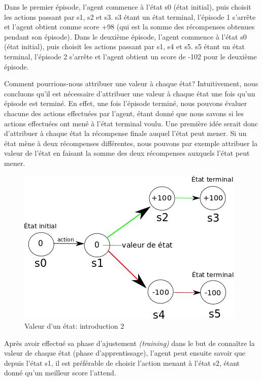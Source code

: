 \documentclass[11pt,a4paper]{report}
\begin{document}
    \newpage
    \par Dans le premier épisode, l'agent commence à l'état s0 (état initial), puis choisit les actions passant par s1, s2 et s3. s3 étant un état terminal, l'épisode 1 s'arrête et l'agent obtient comme score +98 (qui est la somme des récompenses obtenues pendant son épisode). Dans le deuxième épisode, l'agent commence à l'état s0 (état initial), puis choisit les actions passant par s1, s4 et s5. s5 étant un état terminal, l'épisode 2 s'arrête et l'agent obtient un score de -102 pour le deuxième épisode. 
    
    \par Comment pourrions-nous attribuer une valeur à chaque état? Intuitivement, nous concluons qu'il est nécessaire d'attribuer une valeur à chaque état une fois qu'un épisode est terminé. En effet, une fois l'épisode terminé, nous pouvons évaluer chacune des actions effectuées par l'agent, étant donné que nous savons si les actions effectuées ont mené à l'état terminal voulu. Une première idée serait donc d'attribuer à chaque état la récompense finale auquel l'état peut mener. Si un état mène à deux récompenses différentes, nous pouvons par exemple attribuer la valeur de l'état en faisant la somme des deux récompenses auxquels l'état peut mener. 
    
    \begin{figure}[!h]
    \center
    \includegraphics[scale=0.60]{ressources/introduction_function_value_2.png}
    \caption{Valeur d'un état: introduction 2}
    \end{figure}
    
    \par Après avoir effectué sa phase d'ajustement \textit{(training)} dans le but de connaître la valeur de chaque état (phase d'apprentissage), l'agent peut ensuite savoir que depuis l'état s1, il est préférable de choisir l'action menant à l'état s2, étant donné qu'un meilleur score l'attend.
    
\end{document}
